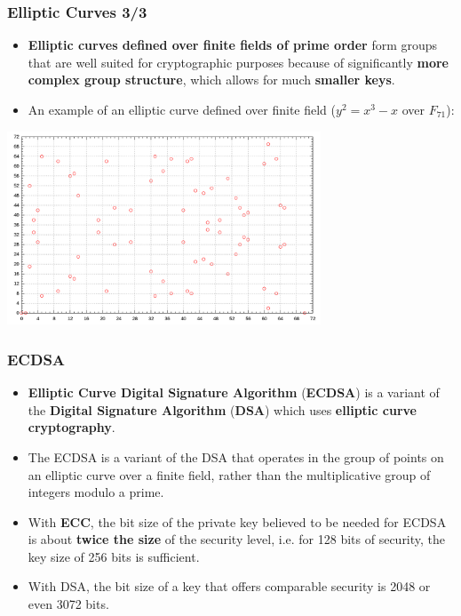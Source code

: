 \documentclass{beamer}
\begin{document}
\begin{frame}
  \frametitle{Elliptic Curves 3/3}
  \begin{itemize}
  \item \textbf{Elliptic curves defined over finite fields of prime order} form
    groups that are well suited for cryptographic purposes because of
    significantly \textbf{more complex group structure}, which allows for much
    \textbf{smaller keys}.
  \item An example of an elliptic curve defined over finite field ($y^2 = x
    ^3 - x$ over $F_{71}$):
  \end{itemize}
  \begin{center}
    \includegraphics[width=0.7\textwidth]{ec_finite_field_group}
  \end{center}
\end{frame}

\begin{frame}
  \frametitle{ECDSA}
  \begin{itemize}  
  \item \textbf{Elliptic Curve Digital Signature Algorithm} (\textbf{ECDSA}) is
    a variant of the \textbf{Digital Signature Algorithm} (\textbf{DSA}) which
    uses \textbf{elliptic curve cryptography}.
  \item The ECDSA is a variant of the DSA that operates in the group of points on an elliptic curve over a finite field, rather than the multiplicative group of integers modulo a prime.
  \item With \textbf{ECC}, the bit size of the private key believed to be needed
    for ECDSA is about \textbf{twice the size} of the security level, i.e. for
    128 bits of security, the key size of 256 bits is sufficient.
  \item With DSA, the bit size of a key that offers comparable security is 2048
    or even 3072 bits.
  \end{itemize}
\end{frame}
\end{document}
